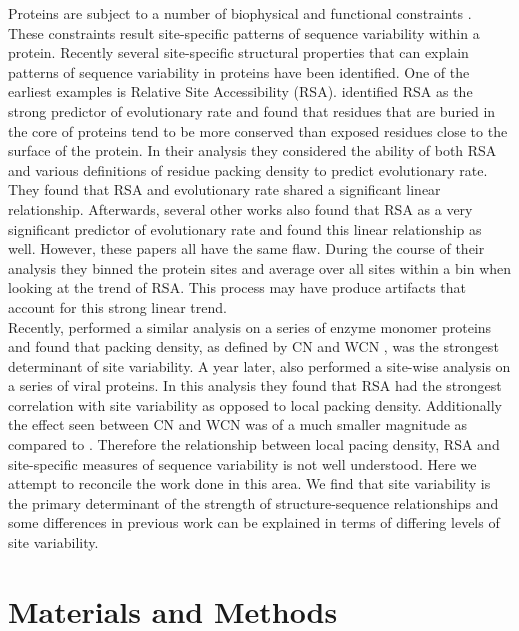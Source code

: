 \documentclass[12pt]{article}
\begin{document}
Proteins are subject to a number of biophysical and functional constraints \citep{Scherreretal2012, Wilkeetal2010}. These constraints result site-specific patterns of sequence variability within a protein. Recently several site-specific structural properties that can explain patterns of sequence variability in proteins have been identified. One of the earliest examples is Relative Site Accessibility (RSA). \cite{Fransozaetal2009} identified RSA as the strong predictor of evolutionary rate and found that residues that are buried in the core of proteins tend to be more conserved than exposed residues close to the surface of the protein. In their analysis they considered the ability of both RSA and various definitions of residue packing density to predict evolutionary rate. They found that RSA and evolutionary rate shared a significant linear relationship. Afterwards, several other works \citep{Ramseyetal2011, Scherreretal2012} also found that RSA as a very significant predictor of evolutionary rate and found this linear relationship as well. However, these papers all have the same flaw. During the course of their analysis they binned the protein sites and average over all sites within a bin when looking at the trend of RSA. This process may have produce artifacts that account for this strong linear trend. \\
\indent Recently, \cite{Yehetal2014} performed a similar analysis on a series of enzyme monomer proteins and found that packing density, as defined by CN and WCN \citep{Liaoetal2005, Yehetal2014, Huangetal2014}, was the strongest determinant of site variability.  A year later, \cite{Shahmoradietal2014} also performed a site-wise analysis on a series of viral proteins. In this analysis they found that RSA had the strongest correlation with site variability as opposed to local packing density. Additionally the effect seen between CN and WCN was of a much smaller magnitude as compared to \citep{Yehetal2014}. Therefore the relationship between local pacing density, RSA and site-specific measures of sequence variability is not well understood. Here we attempt to reconcile the work done in this area. We find that site variability is the primary determinant of the strength of structure-sequence relationships and some differences in previous work can be explained in terms of differing levels of site variability. \\

\section{Materials and Methods}
\label{sec:mam}
\end{document}
